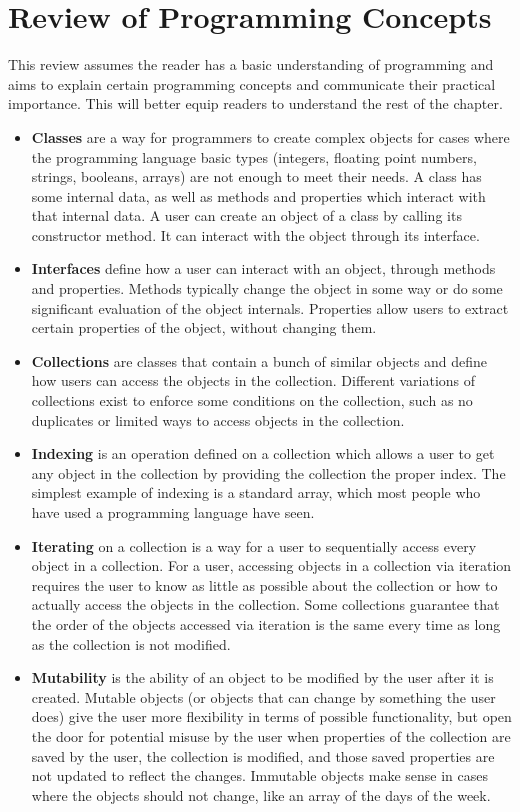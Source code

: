 \section{Review of Programming Concepts}

This review assumes the reader has a basic understanding of programming and aims to explain certain programming concepts and communicate their practical importance. This will better equip readers to understand the rest of the chapter.

\begin{itemize}
    \item \textbf{Classes} are a way for programmers to create complex objects for cases where the programming language basic types (integers, floating point numbers, strings, booleans, arrays) are not enough to meet their needs. A class has some internal data, as well as methods and properties which interact with that internal data. A user can create an object of a class by calling its constructor method. It can interact with the object through its interface.
    \item \textbf{Interfaces} define how a user can interact with an object, through methods and properties. Methods typically change the object in some way or do some significant evaluation of the object internals. Properties allow users to extract certain properties of the object, without changing them.
    \item \textbf{Collections} are classes that contain a bunch of similar objects and define how users can access the objects in the collection. Different variations of collections exist to enforce some conditions on the collection, such as no duplicates or limited ways to access objects in the collection.
    \item \textbf{Indexing} is an operation defined on a collection which allows a user to get any object in the collection by providing the collection the proper index. The simplest example of indexing is a standard array, which most people who have used a programming language have seen.
    \item \textbf{Iterating} on a collection is a way for a user to sequentially access every object in a collection. For a user, accessing objects in a collection via iteration requires the user to know as little as possible about the collection or how to actually access the objects in the collection. Some collections guarantee that the order of the objects accessed via iteration is the same every time as long as the collection is not modified. 
    \item \textbf{Mutability} is the ability of an object to be modified by the user after it is created. Mutable objects (or objects that can change by something the user does) give the user more flexibility in terms of possible functionality, but open the door for potential misuse by the user when properties of the collection are saved by the user, the collection is modified, and those saved properties are not updated to reflect the changes. Immutable objects make sense in cases where the objects should not change, like an array of the days of the week.

\end{itemize}
